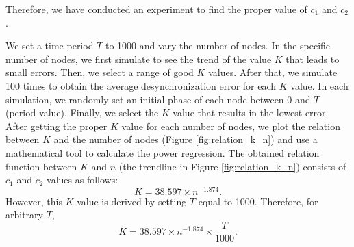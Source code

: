 Therefore, we have conducted an experiment to find the proper value of $c_1$ and $c_2$. 

We set a time period $T$ to 1000 and vary the number of nodes.
In the specific number of nodes, we first simulate to see the trend of the value $K$ that leads to small errors. 
Then, we select a range of good $K$ values. 
After that, we simulate 100 times to obtain the average desynchronization error for each $K$ value. 
In each simulation, we randomly set an initial phase of each node between 0 and $T$ (period value). 
Finally, we select the $K$ value that results in the lowest error. 
After getting the proper $K$ value for each number of nodes, we plot the relation between $K$ and the number of nodes (Figure \ref{fig:relation_k_n}) and use a mathematical tool to calculate the power regression. The obtained relation function between $K$ and $n$ (the trendline in Figure \ref{fig:relation_k_n}) consists of $c_1$ and $c_2$  values as follows:
\begin{equation}
K = 38.597 \times n^{-1.874}.  \nonumber
\end{equation}
However, this $K$ value is derived by setting $T$ equal to 1000. 
Therefore, for arbitrary $T$, 
\begin{equation}
K = 38.597 \times n^{-1.874} \times \frac{T}{1000}.
\end{equation}
